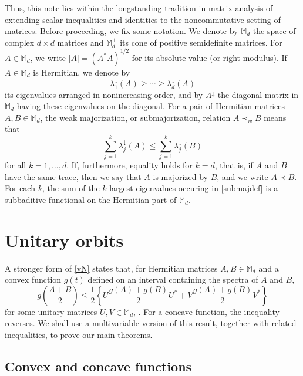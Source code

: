 \documentclass[12pt,reqno]{article}
\theoremstyle{definition}
\theoremstyle{remark}
\numberwithin{equation}{section}
\def\bM{\mathbb{M}}
\begin{document}
Thus, this  note lies within the longstanding tradition in matrix analysis of extending scalar  inequalities and identities to the noncommutative setting of matrices. Before proceeding, 
we  fix some notation.  We denote by $\bM_d$  the space of complex $d\times d$ matrices and $\bM_d^+$  its cone of positive semidefinite matrices. For $A\in\bM_d$, we write $|A|=(A^*A)^{1/2}$  for its absolute value (or right modulus).  If $A\in\bM_d$ is  Hermitian, we denote by 
$$\lambda_1^{\downarrow}(A)\ge \cdots\ge  \lambda_d^{\downarrow}(A)$$  its eigenvalues arranged  in   nonincreasing order, and by
$
A^{\downarrow}$ the diagonal matrix in $\bM_d$ having these eigenvalues on the diagonal. For a pair of Hermitian matrices $A,B\in\bM_d$, the weak majorization, or submajorization, relation $A\prec_w B$ means that
 \begin{equation}\label{submajdef}
\sum_{j=1}^k\lambda_j^{\downarrow}(A) \le  \sum_{j=1}^k\lambda_j^{\downarrow}(B)
\end{equation}
for all $k=1,\ldots, d$. If,
 furthermore,   equality holds for $k=d$, that  is, if $A$ and $B$ have  the same trace, then we say that $A$  is majorized by $B$, and we write $A\prec B$. For each $k$, the  sum of the $k$ largest eigenvalues occuring in \eqref{submajdef} is a subbaditive functional on the Hermitian part of $\bM_d$.

 




\section{Unitary orbits }

A stronger form of  \eqref{vN} states that, for Hermitian matrices $A,B\in\bM_d$ and a convex function $g(t)$ defined on an interval containing the spectra of $A$ and $B$, 
\begin{equation}\label{vNB}
 g\left(\frac{A+B}{2}\right) \le \frac{1}{2}\left\{U \frac{ g(A)+g(B)}{2} U^* + V \frac{ g(A)+g(B)}{2} V^*\right\}
\end{equation}
for some unitary matrices $U,V\in\bM_d$, \cite[Corollary 2.2]{BL}. For a concave function, the inequality reverses. 
We shall use a multivariable version of this result, together with related inequalities, to prove our main theorems.




\subsection{Convex and concave functions}
\end{document}
